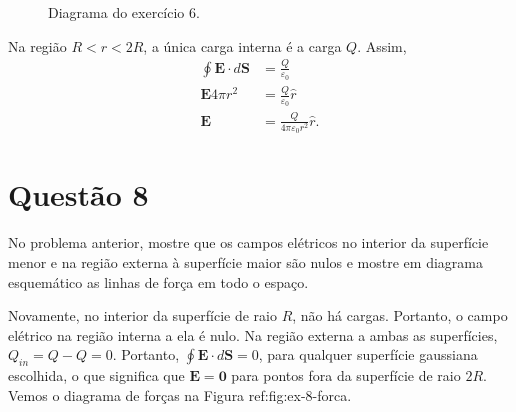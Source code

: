 \documentclass[11pt]{article}
\begin{document}
\begin{figure}[h!]
  \centering
  \caption{Diagrama do exercício 6.}
  \label{fig:ex-6}
\end{figure}
Na região \(R<r<2R\), a única carga interna é a carga \(Q\). Assim,
\begin{align*}
  \oint \mathbf E\cdot d\mathbf S &= \frac{Q}{\varepsilon_0}\\
  \mathbf E 4\pi r^2 &= \frac{Q}{\varepsilon_0}\hat r\\
  \mathbf E  &= \frac{Q}{4\pi \varepsilon_0r^2}\hat r.
\end{align*}

\section{Questão 8}
\label{sec:org0c0390e}
No problema anterior, mostre que os campos elétricos no interior da
superfície menor e na região externa à superfície maior são nulos e
mostre em diagrama esquemático as linhas de força em todo o espaço.

Novamente, no interior da superfície de raio \(R\), não há
cargas. Portanto, o campo elétrico na região interna a ela é nulo. Na
região externa a ambas as superfícies, \(Q_{in}=Q-Q=0\). Portanto, \(\oint\mathbf
E\cdot d\mathbf S = 0\), para qualquer superfície gaussiana escolhida, o que
significa que \(\mathbf E = \mathbf0\) para pontos fora da superfície de
raio \(2R\). Vemos o diagrama de forças na Figura ref:fig:ex-8-forca.
\end{document}
